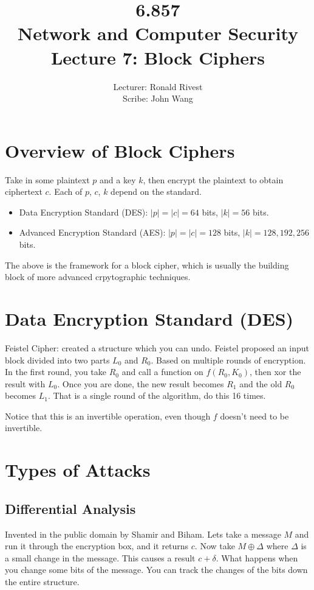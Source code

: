 \documentclass[psamsfonts]{amsart}
\title{6.857 \\
Network and Computer Security \\
Lecture 7: Block Ciphers}
\author{Lecturer: Ronald Rivest\\
Scribe: John Wang}
\begin{document}
\maketitle

\section{Overview of Block Ciphers}

Take in some plaintext $p$ and a key $k$, then encrypt the plaintext to obtain ciphertext $c$. Each of $p$, $c$, $k$ depend on the standard.

\begin{itemize}
  \item Data Encryption Standard (DES): $|p| = |c| = 64$ bits, $|k| = 56$ bits.
  \item Advanced Encryption Standard (AES): $|p| = |c| = 128$ bits, $|k| = 128, 192, 256$ bits.
\end{itemize}

The above is the framework for a block cipher, which is usually the building block of more advanced crpytographic techniques.

\section{Data Encryption Standard (DES)}

Feistel Cipher: created a structure which you can undo. Feistel proposed an input block divided into two parts $L_0$ and $R_0$. Based on multiple rounds of encryption. In the first round, you take $R_0$ and call a function on $f(R_0, K_0)$, then xor the result with $L_0$. Once you are done, the new result becomes $R_1$ and the old $R_0$ becomes $L_1$. That is a single round of the algorithm, do this 16 times.

Notice that this is an invertible operation, even though $f$ doesn't need to be invertible.

\section{Types of Attacks}

\subsection{Differential Analysis}

Invented in the public domain by Shamir and Biham. Lets take a message $M$ and run it through the encryption box, and it returns $c$. Now take $M \oplus \Delta$ where $\Delta$ is a small change in the message. This causes a result $c + \delta$. What happens when you change some bits of the message. You can track the changes of the bits down the entire structure.
\end{document}
